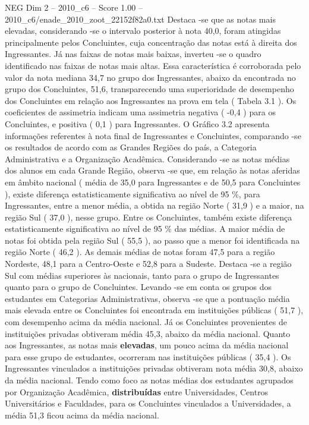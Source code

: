 \begin{textsample}{NEG Dim 2 – 2010\_c6 – Score 1.00 – 2010\_c6/enade\_2010\_zoot\_22152f82a0.txt}
Destaca -se que as notas mais elevadas, considerando -se o intervalo posterior à nota 40,0, foram atingidas principalmente pelos Concluintes, cuja concentração das notas está à direita dos Ingressantes.
Já nas faixas de notas mais baixas, inverteu -se o quadro identificado nas faixas de notas mais altas.
Essa característica é corroborada pelo valor da nota mediana 34,7 no grupo dos Ingressantes, abaixo da encontrada no grupo dos Concluintes, 51,6, transparecendo uma superioridade de desempenho dos Concluintes em relação aos Ingressantes na prova em tela ( Tabela 3.1 ).
Os coeficientes de assimetria indicam uma assimetria negativa ( -0,4 ) para os Concluintes, e positiva ( 0,1 ) para Ingressantes.
O Gráfico 3.2 apresenta informações referentes à nota final de Ingressantes e Concluintes, comparando -se os resultados de acordo com as Grandes Regiões do país, a Categoria Administrativa e a Organização Acadêmica.
Considerando -se as notas médias dos alunos em cada Grande Região, observa -se que, em relação às notas aferidas em âmbito nacional ( média de 35,0 para Ingressantes e de 50,5 para Concluintes ), existe diferença estatisticamente significativa ao nível de 95 \%, para Ingressantes, entre a menor média, a obtida na região Norte ( 31,9 ) e a maior, na região Sul ( 37,0 ), nesse grupo.
Entre os Concluintes, também existe diferença estatisticamente significativa ao nível de 95 \% das médias.
A maior média de notas foi obtida pela região Sul ( 55,5 ), ao passo que a menor foi identificada na região Norte ( 46,2 ).
As demais médias de notas foram 47,5 para a região Nordeste, 48,1 para a Centro-Oeste e 52,8 para a Sudeste.
Destaca -se a região Sul com médias superiores às nacionais, tanto para o grupo de Ingressantes quanto para o grupo de Concluintes.
Levando -se em conta os grupos dos estudantes em Categorias Administrativas, observa -se que a pontuação média mais elevada entre os Concluintes foi encontrada em instituições públicas ( 51,7 ), com desempenho acima da média nacional.
Já os Concluintes provenientes de instituições privadas obtiveram média 45,3, abaixo da média nacional.
Quanto aos Ingressantes, as notas mais \textbf{elevadas}, um pouco acima da média nacional para esse grupo de estudantes, ocorreram nas instituições públicas ( 35,4 ).
Os Ingressantes vinculados a instituições privadas obtiveram nota média 30,8, abaixo da média nacional.
Tendo como foco as notas médias dos estudantes agrupados por Organização Acadêmica, \textbf{distribuídas} entre Universidades, Centros Universitários e Faculdades, para os Concluintes vinculados a Universidades, a média 51,3 ficou acima da média nacional.

\end{textsample}
